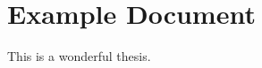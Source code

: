 \documentclass[fontsize=11pt,paper=a4,twoside,openright,cleardoublepage=empty]{scrreprt}
\begin{document}

\cleardoublepage
\setcounter{page}{1}

\section{Example Document}

This is a wonderful thesis.
\end{document}
